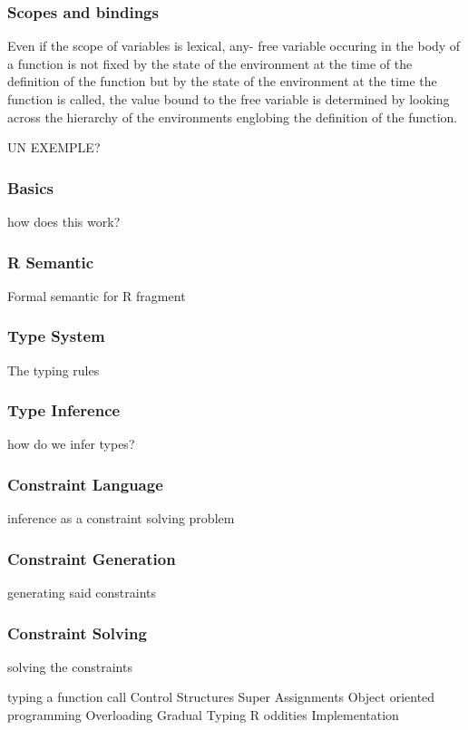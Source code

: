 \subsubsection{Scopes and bindings}

Even if the scope of variables is lexical, any- free variable occuring in the body of a function is not fixed by the state of the environment at the time of the definition of the function but by the state of the environment at the time the function is called, the value bound to the free variable is determined by looking across the hierarchy of the environments englobing the definition of the function.



UN EXEMPLE?



\subsubsection{Basics}

how does this work?

\subsubsection{R Semantic}

Formal semantic for R fragment

\subsubsection{Type System}

The typing rules

\subsubsection{Type Inference}

how do we infer types?

\subsubsection{Constraint Language}

inference as a constraint solving problem

\subsubsection{Constraint Generation}

generating said constraints

\subsubsection{Constraint Solving}

solving the constraints


typing a function call
Control Structures
Super Assignments
Object oriented programming
Overloading
Gradual Typing
R oddities
Implementation
